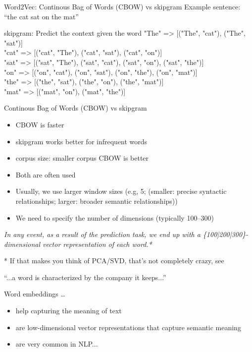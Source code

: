   \begin{frame}{Word2Vec: Continous Bag of Words (CBOW) vs skipgram}
  Example sentence: ``the cat sat on the mat''
  \begin{block}{skipgram: Predict the context given the word}	
    "The" => [("The", "cat"), ("The", "sat")]\\
    "cat" => [("cat", "The"), ("cat", "sat"), ("cat", "on")]\\
    "sat" => [("sat", "The"), ("sat", "cat"), ("sat", "on"), ("sat", "the")]\\
    "on" => [("on", "cat"), ("on", "sat"), ("on", "the"), ("on", "mat")]\\
    "the" => [("the", "sat"), ("the", "on"), ("the", "mat")]\\
    "mat" => [("mat", "on"), ("mat", "the")]\\
  \end{block}
\end{frame}



\begin{frame}{Continous Bag of Words (CBOW) vs skipgram}
  \begin{itemize}
  \item CBOW is faster
  \item skipgram works better for infrequent words
  \item corpus size: smaller corpus CBOW is better
  \item Both are often used
  \item Usually, we use larger window sizes (e.g, 5; (smaller: precise syntactic relationships; larger: broader semantic relationships))
  \item We need to specify the number of dimensions (typically 100--300)
  \end{itemize}
  \pause
  
  \textit{In any event, as a result of the prediction task, we end up with a \{100|200|300\}-dimensional vector representation of each word.*}
  
  
  \tiny{* If that makes you think of PCA/SVD, that's not completely crazy, see \cite{Levy2018}}\\
\end{frame}




\begin{frame}{``...a word is characterized by the company it keeps...''\parencite{Firth1957}}
  \begin{block}{Word embeddings \ldots}
    \begin{itemize}
    \item help capturing the meaning of text
    \item are low-dimensional vector representations that capture semantic meaning
    \item are very common in NLP...
    \end{itemize}
  \end{block}

\end{frame}

